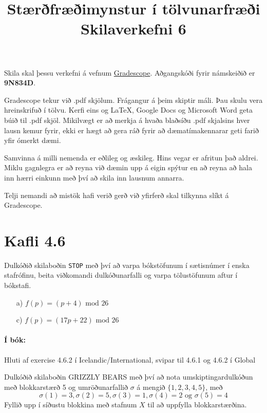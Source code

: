 \documentclass{article}
\title{Stærðfræðimynstur í tölvunarfræði \\ Skilaverkefni 6}
\author{}
\begin{document}
\maketitle

Skila skal þessu verkefni á vefnum \href{https://gradescope.com/courses/9487}{Gradescope}. Aðgangskóði fyrir námskeiðið er \textbf{9N834D}. 

Gradescope tekur við .pdf skjölum. Frágangur á þeim skiptir máli. Þau skulu vera hreinskrifuð í tölvu. Kerfi eins og \LaTeX, Google Docs og Microsoft Word geta búið til .pdf skjöl. Mikilvægt er að merkja á hvaða blaðsíðu .pdf skjalsins hver lausn kemur fyrir, ekki er hægt að gera ráð fyrir að dæmatímakennarar geti farið yfir ómerkt dæmi.

Samvinna á milli nemenda er eðlileg og æskileg. Hins vegar er afritun það aldrei. Miklu gagnlegra er að reyna við dæmin upp á eigin spýtur en að reyna að hala inn hærri einkunn með því að skila inn lausnum annarra.

Telji nemandi að mistök hafi verið gerð við yfirferð skal tilkynna slíkt á Gradescope.

\section{Kafli 4.6}

\question Dulkóðið skilaboðin \texttt{STOP} með því að varpa bókstöfunum í sætisnúmer í enska stafrófinu, beita viðkomandi dulkóðunarfalli og varpa tölustöfunum aftur í bókstafi.

\begin{itemize}
    \item[a)] $f(p) = (p + 4) \text{ mod } 26$
    \item[c)] $f(p) = (17p + 22) \text{ mod } 26$
\end{itemize}

\paragraph{Í bók:} Hluti af exercise 4.6.2 í Icelandic/International, svipar til 4.6.1 og 4.6.2 í Global

\question Dulkóðið skilaboðin GRIZZLY BEARS með því að nota umskiptingardulkóðun með blokkarstærð 5 og umröðunarfallið $\sigma$ á mengið $\{1,2,3,4,5\}$, með
\[
    \sigma(1) = 3, \sigma(2) = 5, \sigma(3) = 1, \sigma(4) = 2 \text{ og } \sigma(5) = 4
\]
Fyllið upp í síðustu blokkina með stafnum $X$ til að uppfylla blokkarstærðina.
\end{document}
